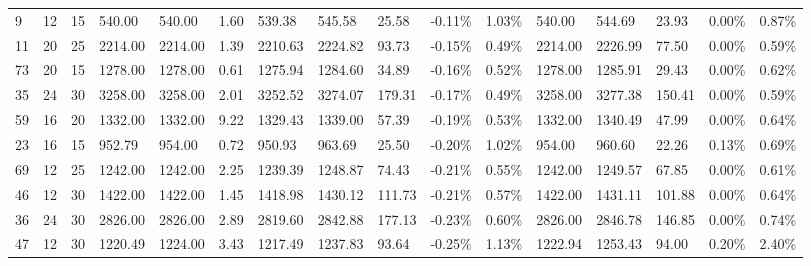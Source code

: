 \documentclass[../main]{subfiles}
\begin{document}
\begin{longtable}{l|ll|lll|lllll|lllll}
   9  & 12                         & 15                         & 540.00                    & 540.00      & 1.60                & 539.38  & 545.58  & 25.58  & -0.11\% & 1.03\% & 540.00  & 544.69  & 23.93  & 0.00\%  & 0.87\% \\
   11 & 20                         & 25                         & 2214.00                   & 2214.00     & 1.39                & 2210.63 & 2224.82 & 93.73  & -0.15\% & 0.49\% & 2214.00 & 2226.99 & 77.50  & 0.00\%  & 0.59\% \\
   73 & 20                         & 15                         & 1278.00                   & 1278.00     & 0.61                & 1275.94 & 1284.60 & 34.89  & -0.16\% & 0.52\% & 1278.00 & 1285.91 & 29.43  & 0.00\%  & 0.62\% \\
   35 & 24                         & 30                         & 3258.00                   & 3258.00     & 2.01                & 3252.52 & 3274.07 & 179.31 & -0.17\% & 0.49\% & 3258.00 & 3277.38 & 150.41 & 0.00\%  & 0.59\% \\
   59 & 16                         & 20                         & 1332.00                   & 1332.00     & 9.22                & 1329.43 & 1339.00 & 57.39  & -0.19\% & 0.53\% & 1332.00 & 1340.49 & 47.99  & 0.00\%  & 0.64\% \\
   23 & 16                         & 15                         & 952.79                    & 954.00      & 0.72                & 950.93  & 963.69  & 25.50  & -0.20\% & 1.02\% & 954.00  & 960.60  & 22.26  & 0.13\%  & 0.69\% \\
   69 & 12                         & 25                         & 1242.00                   & 1242.00     & 2.25                & 1239.39 & 1248.87 & 74.43  & -0.21\% & 0.55\% & 1242.00 & 1249.57 & 67.85  & 0.00\%  & 0.61\% \\
   46 & 12                         & 30                         & 1422.00                   & 1422.00     & 1.45                & 1418.98 & 1430.12 & 111.73 & -0.21\% & 0.57\% & 1422.00 & 1431.11 & 101.88 & 0.00\%  & 0.64\% \\
   36 & 24                         & 30                         & 2826.00                   & 2826.00     & 2.89                & 2819.60 & 2842.88 & 177.13 & -0.23\% & 0.60\% & 2826.00 & 2846.78 & 146.85 & 0.00\%  & 0.74\% \\
   47 & 12                         & 30                         & 1220.49                   & 1224.00     & 3.43                & 1217.49 & 1237.83 & 93.64  & -0.25\% & 1.13\% & 1222.94 & 1253.43 & 94.00  & 0.20\%  & 2.40\% \\

\end{longtable}
\end{document}
